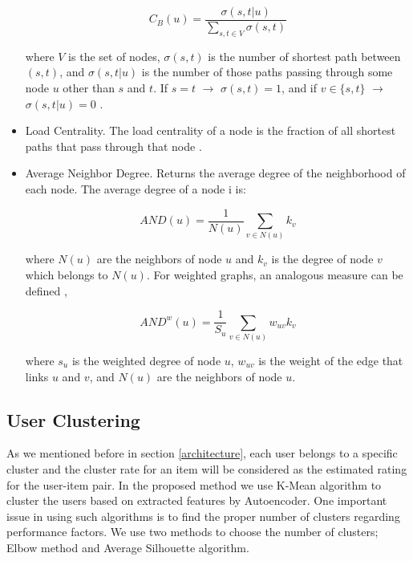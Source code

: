 \documentclass[a4paper,fleqn]{cas-dc}
\begin{document}
\begin{itemize}
	      \begin{equation}
		      C_B(u) = \frac{\sigma(s,t|u)}{\sum_{s,t\in V}^{}\sigma(s,t)}
	      \end{equation}

	      where $V$ is the set of nodes, $\sigma(s,t)$ is the number of shortest path between $(s, t)$, and $\sigma(s,t|u)$ is the number of those paths passing through some node $u$ other than $s$ and $t$. If $s = t$ $\rightarrow$ $\sigma(s,t)=1$, and if $v\in\{s,t\}$ $\rightarrow$ $\sigma(s,t|u)=0$ \citep{47brandes2008a}.

	\item Load Centrality. The load centrality of a node is the fraction of all shortest paths that pass through that node \citep{48newman2001a}.

	\item Average Neighbor Degree. Returns the average degree of the neighborhood of each node. The average degree of a node i is:

	      \begin{equation}
		      AND(u)=\frac{1}{N(u)}\sum_{v\in N(u)}^{}k_v
	      \end{equation}

	      where $N(u)$ are the neighbors of node $u$ and $k_v$ is the degree of node $v$ which belongs to $N(u)$. For weighted graphs, an analogous measure can be defined \citep{49barrat2004a},

	      \begin{equation}
		      AND^w(u)=\frac{1}{S_u}\sum_{v\in N(u)}^{}w_{uv}k_v
	      \end{equation}

	      where $s_u$ is the weighted degree of node $u$, $w_{uv}$ is the weight of the edge that links $u$ and $v$, and $N(u)$ are the neighbors of node $u$.

\end{itemize}


\subsection{User Clustering}
\label{clustering}
As we mentioned before in section \ref{architecture}, each user belongs to a specific cluster and the cluster rate for an item will be considered as the estimated rating for the user-item pair. In the proposed method we use K-Mean algorithm to cluster the users based on extracted features by Autoencoder. One important issue in using such algorithms is to find the proper number of clusters regarding performance factors. We use two methods to choose the number of clusters; Elbow method and Average Silhouette algorithm.
\end{document}
